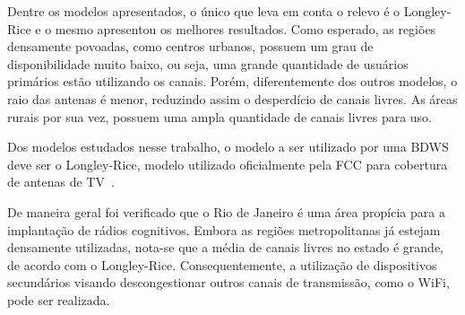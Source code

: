 Dentre os modelos apresentados, o único que leva em conta o relevo é o Longley-Rice e o mesmo apresentou os melhores resultados. Como esperado, as regiões densamente povoadas, como centros urbanos, possuem um grau de disponibilidade muito baixo, ou seja, uma grande quantidade de usuários primários estão utilizando os canais. Porém, diferentemente dos outros modelos, o raio das antenas é menor, reduzindo assim o desperdício de canais livres. As áreas rurais por sua vez, possuem uma ampla quantidade de canais livres para uso.

Dos modelos estudados nesse trabalho, o modelo a ser utilizado por uma BDWS deve ser o Longley-Rice, modelo utilizado oficialmente pela FCC para cobertura de antenas de TV~\cite{fcclongleyrice}.

De maneira geral foi verificado que o Rio de Janeiro é uma área propícia para a implantação de rádios cognitivos. Embora as regiões metropolitanas já estejam densamente utilizadas, nota-se que a média de canais livres no estado é grande, de acordo com o Longley-Rice. Consequentemente, a utilização de dispositivos secundários visando descongestionar outros canais de transmissão, como o WiFi, pode ser realizada.
